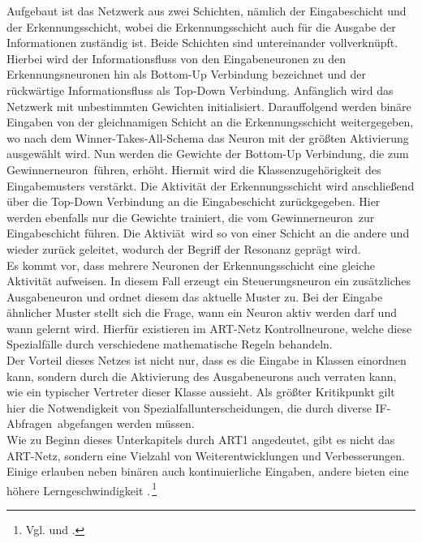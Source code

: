 Aufgebaut ist das Netzwerk aus zwei Schichten, nämlich der Eingabeschicht und der \hbox{Erkennungsschicht}, wobei die Erkennungsschicht auch für die Ausgabe der Informationen zuständig ist. Beide Schichten sind untereinander vollverknüpft. Hierbei wird der Informationsfluss von den Eingabeneuronen zu den Erkennungsneuronen hin als Bottom-Up Verbindung bezeichnet und der rückwärtige Informationsfluss als Top-Down Verbindung. Anfänglich wird das Netzwerk mit unbestimmten Gewichten initialisiert. Darauffolgend werden binäre Eingaben von der gleichnamigen Schicht an die Erkennungsschicht weitergegeben, wo nach dem Winner-Takes-All-Schema das Neuron mit der größten Aktivierung ausgewählt wird. Nun werden die Gewichte der Bottom-Up Verbindung, die zum \glqq Gewinnerneuron\grqq~führen, erhöht. Hiermit wird die Klassenzugehörigkeit des Eingabemusters verstärkt. Die Aktivität der Erkennungsschicht wird anschließend über die Top-Down Verbindung an die Eingabeschicht zurückgegeben. Hier werden ebenfalls nur die Gewichte trainiert, die vom \glqq Gewinnerneuron\grqq~zur Eingabeschicht führen. Die \glqq Aktiviät\grqq~wird so von einer Schicht an die andere und wieder zurück geleitet, wodurch der Begriff der Resonanz geprägt wird.\\
Es kommt vor, dass mehrere Neuronen der Erkennungsschicht eine gleiche Aktivität aufweisen. In diesem Fall erzeugt ein Steuerungsneuron ein zusätzliches Ausgabeneuron und ordnet diesem das aktuelle Muster zu. Bei der Eingabe ähnlicher Muster stellt sich die Frage, wann ein Neuron aktiv werden darf und wann gelernt wird. Hierfür existieren im ART-Netz Kontrollneurone, welche diese Spezialfälle durch verschiedene mathematische Regeln behandeln.\\
Der Vorteil dieses Netzes ist nicht nur, dass es die Eingabe in Klassen einordnen kann, sondern durch die Aktivierung des Ausgabeneurons auch verraten kann, wie ein typischer Vertreter dieser Klasse aussieht. Als größter Kritikpunkt gilt hier die Notwendigkeit von Spezialfallunterscheidungen, die durch diverse \glqq IF-Abfragen\grqq~abgefangen werden müssen.\,\\
Wie zu Beginn dieses Unterkapitels durch ART1 angedeutet, gibt es nicht das ART-Netz, sondern eine Vielzahl von Weiterentwicklungen und Verbesserungen. Einige erlauben neben binären auch kontinuierliche Eingaben, andere bieten eine höhere Lerngeschwindigkeit .\,\footnote{Vgl. \citet[C2.2:1 ff]{Fiesler96} und \citet[89 ff]{Gurney1997}.} 



